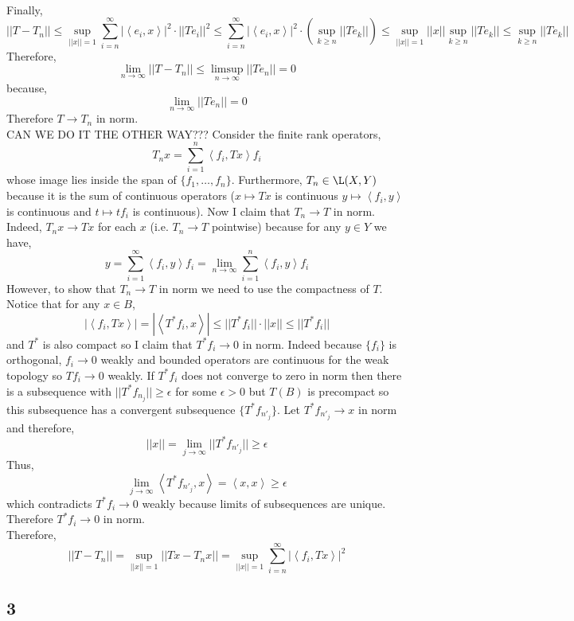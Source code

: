 \documentclass[12pt]{article}
\newcommand{\inner}[2]{\left< #1, #2 \right>}
\begin{document}
\bigskip\\
Finally,
\[ || T - T_n || \le \sup_{|| x || = 1} \sum_{i = n}^\infty | \inner{e_i}{x} |^2 \cdot || T e_i ||^2 \le \sum_{i = n}^\infty | \inner{e_i}{x} |^2 \cdot \left( \sup_{k \ge n} || T e_k || \right) \le \sup_{|| x || = 1} || x || \sup_{k \ge n} || T e_k || \le \sup_{k \ge n} || T e_k || \]
Therefore,
\[ \lim_{n \to \infty} || T - T_n || \le \limsup_{n \to \infty} || T e_n || = 0 \]
because,
\[ \lim_{n \to \infty} || T e_n || = 0 \]
Therefore $T \to T_n$ in norm.
\bigskip\\
CAN WE DO IT THE OTHER WAY???
Consider the finite rank operators,
\[ T_n x = \sum_{i = 1}^n \inner{f_i}{Tx} f_i \]
whose image lies inside the span of $\{ f_1, \dots, f_n \}$. Furthermore, $T_n \in \L(X, Y)$ because it is the sum of continuous operators ($x \mapsto T x$ is continuous $y \mapsto \inner{f_i}{y}$ is continuous and $t \mapsto t f_i$ is continuous). Now I claim that $T_n \to T$ in norm. 
\bigskip\\
Indeed, $T_n x \to T x$ for each $x$ (i.e. $T_n \to T$ pointwise) because for any $y \in Y$ we have,
\[ y = \sum_{i = 1}^\infty \inner{f_i}{y} f_i = \lim_{n \to \infty} \sum_{i = 1}^n \inner{f_i}{y} f_i \]
However, to show that $T_n \to T$ in norm we need to use the compactness of $T$.
\bigskip\\
Notice that for any $x \in B$,
\[ |\inner{f_i}{T x}| = |\inner{T^* f_i}{x}| \le || T^* f_i || \cdot || x || \le || T^* f_i || \] 
and $T^*$ is also compact so I claim that $T^* f_i \to 0$ in norm. Indeed because $\{ f_i \}$ is orthogonal, $f_i \to 0$ weakly and bounded operators are continuous for the weak topology so $T f_i \to 0$ weakly. If $T^* f_i$ does not converge to zero in norm then there is a subsequence with $|| T^* f_{n_j} || \ge \epsilon$ for some $\epsilon > 0$ but $T(B)$ is precompact so this subsequence has a convergent subsequence $\{ T^* f_{n'_j} \}$. Let $T^* f_{n'_j} \to x$ in norm and therefore,
\[ || x || = \lim_{j \to \infty} || T^* f_{n'_j} || \ge \epsilon \]
Thus,
\[ \lim_{j \to \infty} \inner{T^* f_{n'_j}}{x} = \inner{x}{x} \ge \epsilon \]
which contradicts $T^* f_i \to 0$ weakly because limits of subsequences are unique. Therefore $T^* f_i \to 0$ in norm.
\bigskip\\
Therefore,
\[ || T - T_n || = \sup_{|| x || = 1} || T x - T_n x|| = \sup_{|| x || = 1} \sum_{i = n}^\infty | \inner{f_i}{T x} |^2 \]

\subsection{3}
\end{document}
